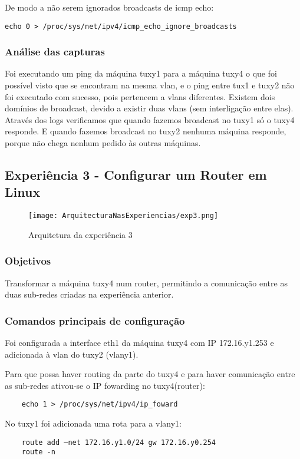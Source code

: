 \documentclass[a4paper]{article}
\begin{document}
De modo a não serem ignorados broadcasts de icmp echo:
\begin{verbatim}
echo 0 > /proc/sys/net/ipv4/icmp_echo_ignore_broadcasts
\end{verbatim}

\subsubsection{Análise das capturas}
Foi executando um ping da máquina tuxy1 para a máquina tuxy4 o que foi possível visto que se encontram na mesma vlan, e o ping entre tux1 e tuxy2 não foi executado com sucesso, pois pertencem a vlans diferentes.
Existem dois domínios de broadcast, devido a existir duas vlans (sem interligação entre elas).
Através dos logs verificamos que quando fazemos broadcast no tuxy1 só o tuxy4 responde. E quando
fazemos broadcast no tuxy2 nenhuma máquina responde, porque não chega nenhum pedido às
outras máquinas.

\subsection{Experiência 3 - Configurar um Router em Linux}

\begin{figure}[h]
    \centering
    \texttt{[image: ArquitecturaNasExperiencias/exp3.png]}
    \caption{Arquitetura da experiência 3}
\end{figure}

\subsubsection{Objetivos}
Transformar a máquina tuxy4 num router, permitindo a comunicação entre as duas sub-redes criadas na experiência anterior.

\subsubsection{Comandos principais de configuração}
Foi configurada a interface eth1 da máquina tuxy4 com IP 172.16.y1.253 e adicionada à vlan do tuxy2 (vlany1).

Para que possa haver routing da parte do tuxy4 e para haver comunicação entre as sub-redes ativou-se o IP fowarding no tuxy4(router):
\begin{verbatim}
	echo 1 > /proc/sys/net/ipv4/ip_foward
\end{verbatim}

No tuxy1 foi adicionada uma rota para a vlany1:
\begin{verbatim}
	route add –net 172.16.y1.0/24 gw 172.16.y0.254
	route -n
\end{verbatim}
\end{document}
